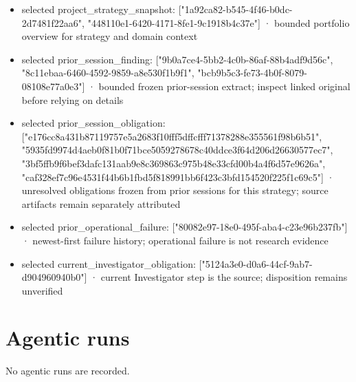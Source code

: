 \documentclass[11pt]{article}
\begin{document}
\begin{itemize}
\item selected project\_strategy\_snapshot: ["1a92ca82-b545-4f46-b0dc-2d7481f22aa6", "448110e1-6420-4171-8fe1-9c1918b4c37e"] · bounded portfolio overview for strategy and domain context
\item selected prior\_session\_finding: ["9b0a7ce4-5bb2-4c0b-86af-88b4adf9d56c", "8c11ebaa-6460-4592-9859-a8e530f1b9f1", "bcb9b5c3-fe73-4b0f-8079-08108e77a0e3"] · bounded frozen prior-session extract; inspect linked original before relying on details
\item selected prior\_session\_obligation: ["e176cc8a431b87119757e5a2683f10fff5dffcfff71378288e355561f98b6b51", "5935fd9974d4aeb0f81b0f71bce5059278678c40ddce3f64d206d26630577ec7", "3bf5ffb9f6bef3dafc131aab9e8c369863c975b48e33cfd00b4a4f6d57e9626a", "caf328ef7c96e4531f44b6b1fbd5f818991bb6f423c3bfd154520f225f1c69c5"] · unresolved obligations frozen from prior sessions for this strategy; source artifacts remain separately attributed
\item selected prior\_operational\_failure: ["80082e97-18e0-495f-aba4-c23e96b237fb"] · newest-first failure history; operational failure is not research evidence
\item selected current\_investigator\_obligation: ["5124a3e0-d0a6-44cf-9ab7-d904960940b0"] · current Investigator step is the source; disposition remains unverified
\end{itemize}
\section{Agentic runs}
No agentic runs are recorded.\par
\end{document}
